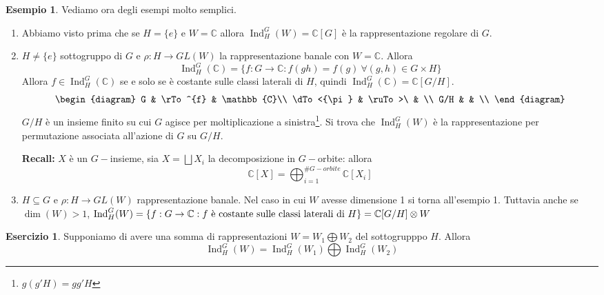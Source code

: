 \documentclass[11pt]{article}
\theoremstyle{plain}
\theoremstyle{definition}
\newtheorem{exmp}{Esempio}[section]
\newtheorem{exercise}{Esercizio}[section]
\theoremstyle{remark}
\newcommand{\C}{\mathbb{C}}
\DeclareMathOperator{\Ind}{Ind}
\begin{document}
\begin{exmp}
Vediamo ora degli esempi molto semplici.
\begin{enumerate}
\item Abbiamo visto prima che se $H=\{e\}$ e $W=\C$ allora $\Ind_H^G(W)=\C[G]$ è la rappresentazione regolare di $G$.
\item $H\neq \{e\}$ sottogruppo di $G$ e $\rho:H\rightarrow GL(W)$ la rappresentazione banale con $W=\C$. Allora
\[\Ind_H^G(\C)=\{f:G\to\C: f(gh)=f(g)\ \forall (g,h)\in G\times H\} \]
Allora $f \in \Ind_H^G(\C)$ se e solo se è costante sulle classi laterali di $H$,
quindi $\Ind_H^G(\C)=\C[G/H]$.
\[
\begin{diagram}
G          & \rTo^{f}            & \C \\
\dTo<{\pi} & \ruTo>\  &    \\
G/H        &                     &    \\
\end{diagram}
\]
$G/H$ è un insieme finito su cui $G$ agisce per moltiplicazione a sinistra\footnote{$g(g'H)=gg'H$}. Si trova che $\Ind_H^G(W)$ è la rappresentazione per permutazione associata all'azione di $G$ su $G/H$.

\textbf{Recall:} $X$ è un $G-$insieme, sia $X= \bigsqcup X_i$ la decomposizione in $G-$orbite: allora
\[\C[X]=\bigoplus_{i=1}^{\# G-orbite} \C[X_i]\]
\item $H\subseteq G$ e $\rho:H\rightarrow GL(W)$ rappresentazione banale. Nel caso in cui $W$ avesse dimensione 1 si torna all'esempio 1. Tuttavia anche se $\dim(W)>1$, $\Ind_H^G(W)=\{f:G\rightarrow \C:f \textup{ è costante sulle classi laterali di } H\}=\C[G/H]\otimes W$
\end{enumerate}
\end{exmp}

\begin{exercise} Supponiamo di avere una somma di rappresentazioni $W=W_1\bigoplus W_2$ del sottogrupppo $H$. Allora
\[\Ind_H^G(W)=\Ind_H^G(W_1)\bigoplus \Ind_H^G(W_2)\]
\end{exercise}
\end{document}
